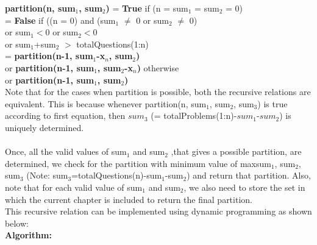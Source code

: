 \documentclass{article}
\begin{document}
\textbf{partition(n, sum$_{1}$, sum$_{2}$)} = \textbf{True} \hspace{0.7cm} if (n = sum$_{1}$ = sum$_{2}$ = 0)
\\\indent  \hspace{4.35cm}     = \textbf{False} \hspace{0.7cm} if ((n = 0) and (sum$_{1}$ $\neq$ 0 or sum$_{2}$ $\neq$ 0)
\\\indent  \hspace{6.5cm} or sum$_{1}<0$ or sum$_{2}<0$ 
\\\indent  \hspace{6.5cm} or sum$_{1}$+sum$_{2}$ $>$ totalQuestions(1:n)
\\\indent  \hspace{4.35cm}     = \textbf{partition(n-1, sum$_{1}$-x$_{n}$, sum$_{2}$) }
\\\indent  \hspace{4.85cm}or \textbf{partition(n-1, sum$_{1}$, sum$_{2}$-x$_{n}$) }\hspace{1 cm} otherwise
\\\indent  \hspace{4.85cm}or \textbf{partition(n-1, sum$_{1}$, sum$_{2}$)}
\\
Note that for the cases when partition is possible, both the recursive relations are equivalent. This is because whenever partition(n, sum$_{1}$, sum$_{2}$, sum$_{3}$) is true according to first equation, then $sum_{3}$ (= totalProblems(1:n)-$sum_1$-$sum_2$) is uniquely determined. 
\\
\\
Once, all the valid values of sum$_{1}$ and sum$_{2}$ ,that gives a possible partition, are determined, we check for the partition with minimum value of max{sum$_{1}$, sum$_{2}$, sum$_{3}$} (Note: sum$_{3}$=totalQuestions(n)-sum$_{1}$-sum$_{2}$) and return that partition. Also, note that for each valid value of sum$_{1}$ and sum$_{2}$, we also need to store the set in which the current chapter is included to return the final partition.
\\
This recursive relation can be implemented using dynamic programming as shown below:
\\
\textbf{Algorithm:}

\end{document}
